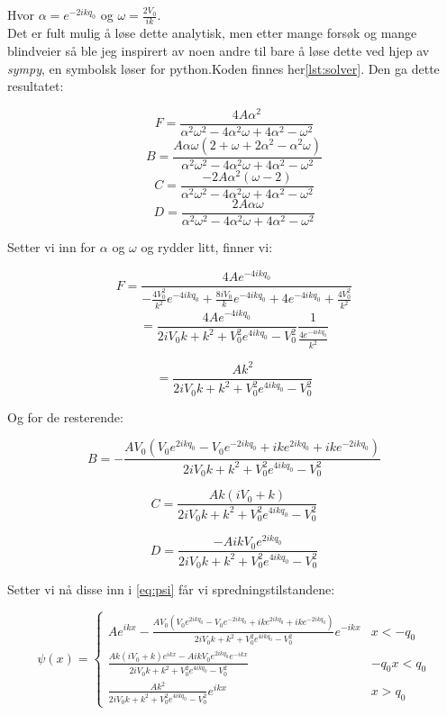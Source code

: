 \documentclass[a4paper,norsk, 10pt]{article}
\numberwithin{equation}{section}
\begin{document}
Hvor $\alpha = e^{-2ikq_0}$ og $\omega = \frac{2V_0}{ik}$.\\

Det er fult mulig å løse dette analytisk, men etter mange forsøk og mange blindveier så ble jeg inspirert av noen andre til bare å løse dette ved hjep av \textit{sympy}, en symbolsk løser for python.Koden finnes her\ref{lst:solver}. Den ga dette resultatet:

$$
F = \frac{4A\alpha^2}{\alpha^2\omega^2 - 4\alpha^2\omega + 4\alpha^2 - \omega^2}
$$
$$
B = \frac{A\alpha\omega(2+\omega +2\alpha^2 - \alpha^2\omega)}{\alpha^2\omega^2 - 4\alpha^2\omega + 4\alpha^2 - \omega^2}
$$
$$
C = \frac{-2A\alpha^2(\omega - 2)}{\alpha^2\omega^2 - 4\alpha^2\omega + 4\alpha^2 - \omega^2}
$$
$$
D = \frac{2A\alpha\omega}{\alpha^2\omega^2 - 4\alpha^2\omega + 4\alpha^2 - \omega^2}
$$

Setter vi inn for $\alpha$ og $\omega$ og rydder litt, finner vi:

$$
F = \frac{4Ae^{-4ikq_0}}{-\frac{4V_0^2}{k^2}e^{-4ikq_0} + \frac{8iV_0}{k}e^{-4ikq_0} + 4e^{-4ikq_0} + \frac{4V_0^2}{k^2}}
$$
$$
= \frac{4Ae^{-4ikq_0}}{2iV_0k + k^2 +V_0^2e^{4ikq_0} - V_0^2}\frac{1}{\frac{4e^{-4ikq_0}}{k^2}}
$$

\begin{equation}
= \frac{Ak^2}{2iV_0k + k^2 +V_0^2e^{4ikq_0} - V_0^2}
\label{eq:F}
\end{equation}

Og for de resterende:

\begin{equation}
B = -\frac{AV_0\left(V_0e^{2ikq_0} - V_0e^{-2ikq_0} + ike^{2ikq_0} + ike^{-2ikq_0}\right)}{2iV_0k + k^2 +V_0^2e^{4ikq_0} - V_0^2}
\label{eq:B}
\end{equation}

\begin{equation}
C = \frac{Ak(iV_0 + k)}{2iV_0k + k^2 +V_0^2e^{4ikq_0} - V_0^2}
\label{eq:C}
\end{equation}

\begin{equation}
D = \frac{-AikV_0e^{2ikq_0}}{2iV_0k + k^2 +V_0^2e^{4ikq_0} - V_0^2}
\label{eq:D}
\end{equation}

Setter vi nå disse inn i \ref{eq:psi} får vi spredningstilstandene:

\begin{equation}
\psi(x) =
\begin{cases}
Ae^{ikx} -\frac{AV_0\left(V_0e^{2ikq_0} - V_0e^{-2ikq_0} + ike^{2ikq_0} + ike^{-2ikq_0}\right)}{2iV_0k + k^2 +V_0^2e^{4ikq_0} - V_0^2}e^{-ikx} & x< -q_0 \\
\frac{Ak(iV_0 + k)e^{ikx} -AikV_0e^{2ikq_0}e^{-ikx}}{2iV_0k + k^2 +V_0^2e^{4ikq_0} - V_0^2} & -q_0x< q_0 \\
\frac{Ak^2}{2iV_0k + k^2 +V_0^2e^{4ikq_0} - V_0^2}e^{ikx} & x>q_0 
\end{cases}
\end{equation}
\end{document}
